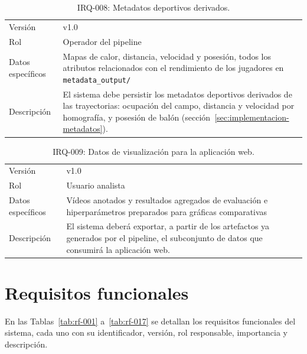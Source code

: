 \begin{table}[htp]
\centering
\caption{IRQ-008: Metadatos deportivos derivados.}
\label{tab:irq-008}
\renewcommand{\arraystretch}{1.2}
\begin{tabular}{|p{3.1cm}|p{9.2cm}|}
\hline
\rowcolor{gray!25}
\multicolumn{2}{|l|}{\textbf{IRQ-008 -- Metadatos deportivos derivados}} \\
\hline
Versión & v1.0 \\
\hline
Rol & Operador del pipeline \\
\hline
Datos específicos & Mapas de calor, distancia, velocidad y posesión, todos los atributos relacionados con el rendimiento de los jugadores en
  \texttt{metadata\_output/} \\
\hline
Descripción & El sistema debe persistir los metadatos deportivos derivados
  de las trayectorias: ocupación del campo, distancia y velocidad por
  homografía, y posesión de balón
  (sección~\ref{sec:implementacion-metadatos}). \\
\hline
\end{tabular}
\end{table}

\begin{table}[htp]
\centering
\caption{IRQ-009: Datos de visualización para la aplicación web.}
\label{tab:irq-009}
\renewcommand{\arraystretch}{1.2}
\begin{tabular}{|p{3.1cm}|p{9.2cm}|}
\hline
\rowcolor{gray!25}
\multicolumn{2}{|l|}{\textbf{IRQ-009 -- Datos de visualización para la aplicación web}} \\
\hline
Versión & v1.0 \\
\hline
Rol & Usuario analista \\
\hline
Datos específicos & Vídeos anotados y resultados agregados
  de evaluación e hiperparámetros preparados para gráficas comparativas \\
\hline
Descripción & El sistema deberá exportar, a partir de los artefactos ya
  generados por el pipeline, el subconjunto de datos que consumirá la
  aplicación web.\\
\hline
\end{tabular}
\end{table}

\section{Requisitos funcionales}
\label{sec:analisis-rf}

En las Tablas~\ref{tab:rf-001} a~\ref{tab:rf-017} se detallan los
requisitos funcionales del sistema, cada uno con su identificador, versión,
rol responsable, importancia y descripción.

